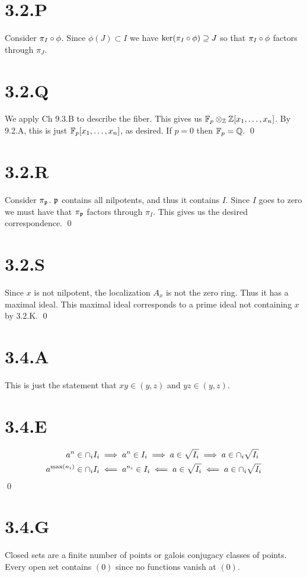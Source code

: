 \documentclass{article}
\begin{document}
\section{3.2.P}
Consider $\pi_I \circ \phi$. Since $\phi(J) \subset I$ we have
$\ker(\pi_I \circ \phi) \supseteq J$ so that $\pi_I \circ \phi$ factors through
$\pi_J$.

\section{3.2.Q}
We apply Ch 9.3.B to describe the fiber. This gives us $\mathbb{F}_p \otimes_{\mathbb{Z}} \mathbb{Z}[x_1, \dots, x_n]$.
By 9.2.A, this is just $\mathbb{F}_p[x_1, \dots, x_n]$, as desired. If
$p=0$ then $\mathbb{F}_p=\mathbb{Q}$. \qed

\section{3.2.R}
Consider $\pi_{\mathfrak{p}}$. $\mathfrak{p}$ contains all
nilpotents, and thus it contains $I$. Since
$I$ goes to zero we must have that $\pi_{\mathfrak{p}}$
factors through $\pi_I$. This gives us the desired
correspondence. \qed

\section{3.2.S}
Since $x$ is not nilpotent, the localization
$A_x$ is not the zero ring. Thus it has a maximal ideal. This
maximal ideal corresponds to a prime ideal not containing
$x$ by 3.2.K. \qed

\section{3.4.A}
This is just the statement that $xy \in (y,z)$ and
$yz \in (y, z)$.

\section{3.4.E}
\begin{align*}
    a^n           & \in \cap_i I_i \implies a^n \in I_i \implies a \in \sqrt{I_i} \implies a \in \cap_i \sqrt{I_i}           \\
    a^{\max(n_i)} & \in \cap_i I_i \impliedby a^{n_i} \in I_i \impliedby a \in \sqrt{I_i} \impliedby a \in \cap_i \sqrt{I_i}
\end{align*}
\qed

\section{3.4.G}
Closed sets are a finite number of points or galois conjugacy classes of
points. Every open set contains $(0)$ since no functions
vanish at $(0)$.
\end{document}

